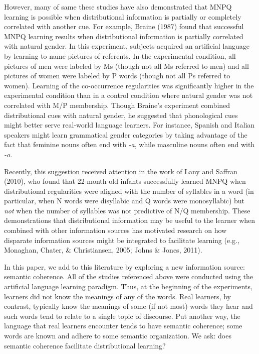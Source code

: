 \documentclass[man,floatsintext]{apa6}
\begin{document}
However, many of same these studies have also demonstrated that MNPQ learning is possible when distributional information is partially or completely correlated with another cue. For example, Braine (1987) found that successful MNPQ learning results when distributional information is partially correlated with natural gender. In this experiment, subjects acquired an artificial language by learning to name pictures of referents. In the experimental condition, all pictures of men were labeled by Ms (though not all Ms referred to men) and all pictures of women were labeled by P words (though not all Ps referred to women). Learning of the co-occurrence regularities was significantly higher in the experimental condition than in a control condition where natural gender was not correlated with M/P membership. Though Braine's experiment combined distributional cues with natural gender, he suggested that phonological cues might better serve real-world language learners. For instance, Spanish and Italian speakers might learn grammatical gender categories by taking advantage of the fact that feminine nouns often end with \emph{-a}, while masculine nouns often end with \emph{-o}.

Recently, this suggestion received attention in the work of Lany and Saffran (2010), who found that 22-month old infants successfully learned MNPQ when distributional regularities were aligned with the number of syllables in a word (in particular, when N words were disyllabic and Q words were monosyllabic) but \emph{not} when the number of syllables was not predictive of N/Q membership. These demonstrations that distributional information may be useful to the learner when combined with other information sources has motivated research on how disparate information sources might be integrated to facilitate learning (e.g., Monaghan, Chater, \& Christiansen, 2005; Johns \& Jones, 2011).

In this paper, we add to this literature by exploring a new information source: semantic coherence. All of the studies referenced above were conducted using the artificial language learning paradigm. Thus, at the beginning of the experiments, learners did not know the meanings of any of the words. Real learners, by contrast, typically know the meanings of some (if not most) words they hear and such words tend to relate to a single topic of discourse. Put another way, the language that real learners encounter tends to have semantic coherence; some words are known and adhere to some semantic organization. We ask: does semantic coherence facilitate distributional learning?
\end{document}
